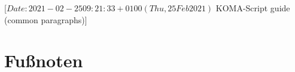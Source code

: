%
%
%
%
%
%
%
%
% 
%
%
%
%

%
                 [$Date: 2021-02-25 09:21:33 +0100 (Thu, 25 Feb 2021) $
                  KOMA-Script guide (common paragraphs)]

\section{Fußnoten}
%
\BeginIndexGroup
{}%

